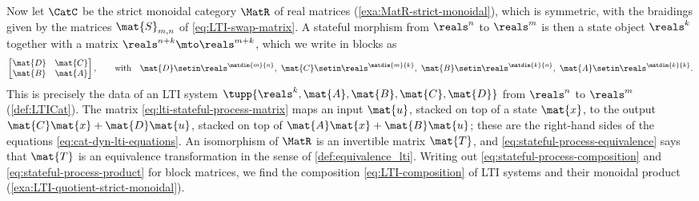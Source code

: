 Now let $\CatC$ be the strict monoidal category $\MatR$ of real matrices (\cref{exa:MatR-strict-monoidal}), which is symmetric, with the braidings given by the matrices $\mat{S}_{m,n}$ of \cref{eq:LTI-swap-matrix}.
A stateful morphism from $\reals^n$ to $\reals^m$ is then a state object $\reals^k$ together with a matrix $\reals^{n+k} \mto \reals^{m+k}$, which we write in blocks as
\begin{equation}
    \label{eq:lti-stateful-process-matrix}
    \begin{bmatrix}
        \mat{D} & \mat{C} \\
        \mat{B} & \mat{A}
    \end{bmatrix},
    \qquad \text{with} \quad
    \mat{D} \setin \reals^{\matdim{m}{n}}, \
    \mat{C} \setin \reals^{\matdim{m}{k}}, \
    \mat{B} \setin \reals^{\matdim{k}{n}}, \
    \mat{A} \setin \reals^{\matdim{k}{k}}.
\end{equation}
This is precisely the data of an LTI system $\tupp{\reals^k, \mat{A}, \mat{B}, \mat{C}, \mat{D}}$ from $\reals^n$ to $\reals^m$ (\cref{def:LTICat}).
The matrix \cref{eq:lti-stateful-process-matrix} maps an input $\mat{u}$, stacked on top of a state $\mat{x}$, to the output $\mat{C}\mat{x} + \mat{D}\mat{u}$, stacked on top of $\mat{A}\mat{x} + \mat{B}\mat{u}$; these are the right-hand sides of the equations \cref{eq:cat-dyn-lti-equations}.
An isomorphism of $\MatR$ is an invertible matrix $\mat{T}$, and \cref{eq:stateful-process-equivalence} says that $\mat{T}$ is an equivalence transformation in the sense of \cref{def:equivalence_lti}.
Writing out \cref{eq:stateful-process-composition} and \cref{eq:stateful-process-product} for block matrices, we find the composition \cref{eq:LTI-composition} of LTI systems and their monoidal product (\cref{exa:LTI-quotient-strict-monoidal}).

